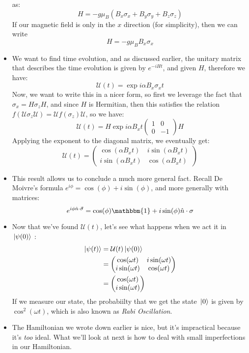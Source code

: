 \begin{itemize}
		as: 
		\[
		H = -g \mu_B (B_x \sigma_x + B_y \sigma_y + B_z \sigma_z) 
		\] 
		If our magnetic field is only in the \( x \) direction (for simplicity), then we can write
		\[
		H = -g \mu_B B_x \sigma_x
		\] 
	\item We want to find time evolution, and as discussed earlier, the unitary matrix that describes the time evolution
		is given by \( e^{-i H t} \), and given \( H \), therefore we have: 
		\[
			\mathcal U(t) = \exp{i \alpha B_x \sigma_x t}		
		\] 
		Now, we want to write this in a nicer form, so first we leverage the fact that \( \sigma_x = 
		H \sigma_z H\), and since \( H \) is Hermitian, then this satisfies the relation 
		\( f(\mathcal U \sigma_z \mathcal U) = \mathcal U f(\sigma_z) \mathcal U \), so we have: 
		\[
			\mathcal U(t) = H \exp{i \alpha B_x t \begin{pmatrix} 1 & 0\\0&-1 \end{pmatrix}} H
		\] 
		Applying the exponent to the diagonal matrix, we eventually get: 
		\[
			\mathcal U(t) = \begin{pmatrix} \cos(\alpha B_x t) & i \sin (\alpha B_x t)\\
			i \sin (\alpha B_x t) & \cos(\alpha B_x t)\end{pmatrix} 
		\] 
	\item This result allows us to conclude a much more general fact. Recall De Moivre's formula
		\( e^{ i \phi} = \cos(\phi) + i \sin(\phi) \), and more generally with matrices: 
		\[
			e^{i \phi \hat{n} \cdot \vec \sigma} = \cos(\phi) \mathbbm{1} + i \sin(\phi) \hat{n} \cdot \sigma
		\] 
	\item Now that we've found \( \mathcal U(t) \), let's see what happens when we act it in \( \ket*{\psi(0)} \) :
		\begin{align*}
			\ket*{\psi(t)} &= \mathcal U(t) \ket*{\psi(0)}\\
			&= \begin{pmatrix} \cos(\omega t) & i \sin (\omega t) \\ i \sin(\omega t) & \cos(\omega t) \end{pmatrix}  \\
			&= \begin{pmatrix} \cos(\omega t)\\ i \sin(\omega t) \end{pmatrix}  
		\end{align*}
		If we measure our state, the probabiilty that we get the state \( \ket*{0} \) is given by 
		\( \cos^2(\omega t) \), which is also known as \textit{Rabi Oscillation}. 
	\item The Hamiltonian we wrote down earlier is nice, but it's impractical because it's \textit{too} ideal. What 
		we'll look at next is how to deal with small imperfections in our Hamiltonian.
\end{itemize}
